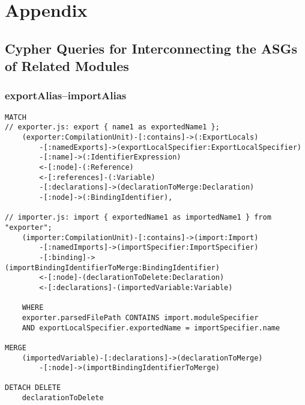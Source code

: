 \appendix
\chapter*{Appendix}
{}
\renewcommand{\thesection}{\Alph{section}}

\section{Cypher Queries for Interconnecting the ASGs of Related Modules}

\subsection{exportAlias–importAlias}
\begin{lstlisting}[language=Cypher]
MATCH
// exporter.js: export { name1 as exportedName1 };
    (exporter:CompilationUnit)-[:contains]->(:ExportLocals)
        -[:namedExports]->(exportLocalSpecifier:ExportLocalSpecifier)
        -[:name]->(:IdentifierExpression)
        <-[:node]-(:Reference)
        <-[:references]-(:Variable)
        -[:declarations]->(declarationToMerge:Declaration)
        -[:node]->(:BindingIdentifier),

// importer.js: import { exportedName1 as importedName1 } from "exporter";
    (importer:CompilationUnit)-[:contains]->(import:Import)
        -[:namedImports]->(importSpecifier:ImportSpecifier)
        -[:binding]->(importBindingIdentifierToMerge:BindingIdentifier)
        <-[:node]-(declarationToDelete:Declaration)
        <-[:declarations]-(importedVariable:Variable)

    WHERE
    exporter.parsedFilePath CONTAINS import.moduleSpecifier
    AND exportLocalSpecifier.exportedName = importSpecifier.name

MERGE
    (importedVariable)-[:declarations]->(declarationToMerge)
        -[:node]->(importBindingIdentifierToMerge)

DETACH DELETE
    declarationToDelete
\end{lstlisting}


\newpage

